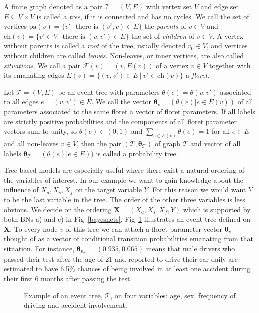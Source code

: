 \documentclass[runningheads]{llncs}
\begin{document}
A finite graph denoted as a pair $\mathcal{T} = (V,E)$ with vertex set $V$ and edge set $E \subseteq V \times V$ is called a \emph{tree}, if it is connected and has no cycles. We call the set of vertices $\text{pa}(v) = \{v' \ | \ \text{there is } (v',v) \in E\}$ the \emph{parents} of $v \in V$ and $\text{ch}(v)=\{v' \in V \ | \ \text{there is } (v,v') \in E\}$ the set of \emph{children} of $v \in V$. A vertex without parents is called a \emph{root} of the tree, usually denoted $v_0 \in V$, and vertices without children are called \emph{leaves}. Non-leaves, or inner vertices, are also called \emph{situations}. We call a pair $\mathcal{F}(v) = (v,E(v))$ of a vertex $v \in V$ together with its emanating edges $E(v) = \{(v,v') \in E \ | \ v' \in \text{ch}(v)\}$ a \emph{floret}.
\begin{definition}
Let $\mathcal{T} = (V, E)$ be an event tree with parameters $\theta(e) = \theta(v, v')$ associated to all edges $e = (v, v') \in E$. We call the vector $\boldsymbol{\theta}_v = (\theta(e)| e \in E(v))$ of all parameters associated to the same floret a vector of floret parameters. If all labels are strictly positive probabilities and the components of all floret parameter vectors sum to unity, so  $\theta(e) \in (0,1)$ and $\sum_{e \in E(v)}\theta(e) = 1$ for all $e \in E$ and all non-leaves $v \in V$, then the pair
$(\mathcal{T}, \boldsymbol{\theta}_{\mathcal{T}})$ of graph $\mathcal{T}$ and vector of all labels $\boldsymbol{\theta}_{\mathcal{T}} = (\theta(e)| e \in E))$ is called a probability tree.
\end{definition}
Tree-based models are especially useful where there exist a natural ordering of the variables of interest. In our example we want to gain knowledge about the influence of $X_a, X_s, X_f$ on the target variable $Y$. For this reason we would want $Y$ to be the last variable in the tree. The order of the other three variables is less obvious. We decide on the ordering $\boldsymbol{X} = (X_a, X_s, X_f, Y)$ which is supported by both BNs a) and c) in Fig~\ref{bayesnets}. 
Fig~\ref{eventtree} illustrates an event tree defined on $\boldsymbol{X}$. To every node $v$ of this tree we can attach a floret parameter vector $\boldsymbol{\theta}_v$ thought of as a vector of conditional transition probabilities emanating from that situation. For instance, $\boldsymbol{\theta}_{v_{25}} = (0.935, 0.065)$ means that male drivers who passed their test after the age of 21 and reported to drive their car daily are estimated to have 6.5\% chances of being involved in at least one accident during their first 6 months after passing the test. 
\begin{figure}
\centering

\caption{Example of an event tree, $\mathcal{T}$, on four variables: age, sex, frequency of driving and accident involvement.}
\label{eventtree}
\end{figure}
\end{document}
